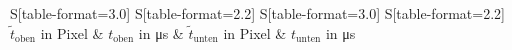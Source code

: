 \begin{table}
    \centering
    \caption{Aus den B-Scans bestimmte Laufzeiten in Pixeln $\tilde{t}$ und umgerechnete Laufzeiten $t$}
    \label{tab:Zeit}
    \begin{tabular}{
	S[table-format=3.0]
	S[table-format=2.2]
	S[table-format=3.0]
	S[table-format=2.2]
	}
	\toprule
	{$\tilde{t}_\text{oben}$ in \si{Pixel}}		& {$t_\text{oben}$ in \si{\micro\second}}		& 
	{$\tilde{t}_\text{unten}$ in \si{Pixel}}		& {$t_\text{unten}$ in \si{\micro\second}}		\\ 
	\midrule
    
    \bottomrule
    \end{tabular}
    \end{table}
